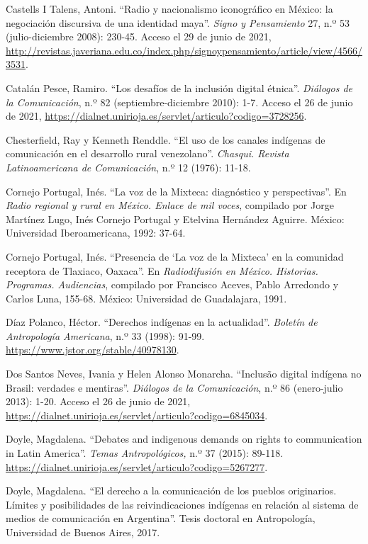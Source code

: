 \documentclass{tufte-handout}
\begin{document}
\begin{hangparas}{.25in}{1}
Castells I Talens, Antoni. ``Radio y nacionalismo iconográfico en
México: la negociación discursiva de una identidad maya''. \emph{Signo y
Pensamiento} 27, n.º 53 (julio-diciembre 2008): 230-45. Acceso el 29 de
junio de 2021,
\url{http://revistas.javeriana.edu.co/index.php/signoypensamiento/article/view/4566/3531}.

Catalán Pesce, Ramiro. ``Los desafíos de la inclusión digital étnica''.
\emph{Diálogos de la Comunicación}, n.º 82 (septiembre-diciembre 2010):
1-7. Acceso el 26 de junio de 2021,
\url{https://dialnet.unirioja.es/servlet/articulo?codigo=3728256}.

Chesterfield, Ray y Kenneth Renddle. ``El uso de los canales indígenas
de comunicación en el desarrollo rural venezolano''. \emph{Chasqui.
Revista Latinoamericana de Comunicación}, n.º 12 (1976): 11-18.

Cornejo Portugal, Inés. ``La voz de la Mixteca: diagnóstico y
perspectivas''. En \emph{Radio regional y rural en México. Enlace de mil
voces}, compilado por Jorge Martínez Lugo, Inés Cornejo Portugal y
Etelvina Hernández Aguirre. México: Universidad Iberoamericana, 1992:
37-64.

Cornejo Portugal, Inés. ``Presencia de `La voz de la Mixteca' en la
comunidad receptora de Tlaxiaco, Oaxaca''. En \emph{Radiodifusión en
México. Historias. Programas. Audiencias}, compilado por Francisco
Aceves, Pablo Arredondo y Carlos Luna, 155-68. México: Universidad de
Guadalajara, 1991.

Díaz Polanco, Héctor. ``Derechos indígenas en la actualidad''.
\emph{Boletín de Antropología Americana}, n.º 33 (1998): 91-99.
\url{https://www.jstor.org/stable/40978130}.

Dos Santos Neves, Ivania y Helen Alonso Monarcha. ``Inclusão digital
indígena no Brasil: verdades e mentiras''. \emph{Diálogos de la
Comunicación}, n.º 86 (enero-julio 2013): 1-20. Acceso el 26 de junio de
2021, \url{https://dialnet.unirioja.es/servlet/articulo?codigo=6845034}.

Doyle, Magdalena. ``Debates and indigenous demands on rights to
communication in Latin America''. \emph{Temas Antropológicos,} n.º 37
(2015): 89-118. \url{https://dialnet.unirioja.es/servlet/articulo?codigo=5267277}.

Doyle, Magdalena. ``El derecho a la comunicación de los pueblos
originarios. Límites y posibilidades de las reivindicaciones indígenas
en relación al sistema de medios de comunicación en Argentina''. Tesis
doctoral en Antropología, Universidad de Buenos Aires, 2017.


\end{hangparas}
\end{document}
